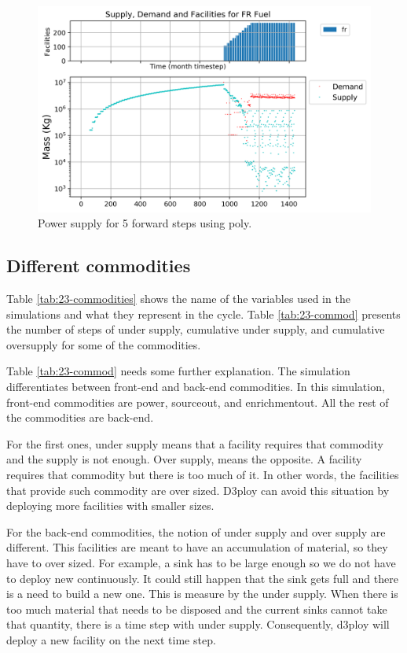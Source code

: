\documentclass[11pt]{article}
\begin{document}
\begin{figure}[H]
	\centering
	\includegraphics[width=\textwidth]{23-figures/0-S5-poly-mixerout.png} 
	\hfill
	\caption{Power supply for 5 forward steps using poly.}
	\label{fig:23-ste-fft-mixerout}
\end{figure}

\subsection{Different commodities}

Table \ref{tab:23-commodities} shows the name of the variables used in the simulations and what they represent in the cycle. Table \ref{tab:23-commod} presents the number of steps of under supply, cumulative under supply, and cumulative oversupply for some of the commodities.

Table \ref{tab:23-commod} needs some further explanation. The simulation differentiates between front-end and back-end commodities. In this simulation, front-end commodities are power, sourceout, and enrichmentout. All the rest of the commodities are back-end. 

For the first ones, under supply means that a facility requires that commodity and the supply is not enough. Over supply, means the opposite. A facility requires that commodity but there is too much of it. In other words, the facilities that provide such commodity are over sized. D3ploy can avoid this situation by deploying more facilities with smaller sizes.

For the back-end commodities, the notion of under supply and over supply are different. This facilities are meant to have an accumulation of material, so they have to over sized. For example, a sink has to be large enough so we do not have to deploy new continuously. It could still happen that the sink gets full and there is a need to build a new one. This is measure by the under supply. When there is too much material that needs to be disposed and the current sinks cannot take that quantity, there is a time step with under supply. Consequently, d3ploy will deploy a new facility on the next time step.
\end{document}
